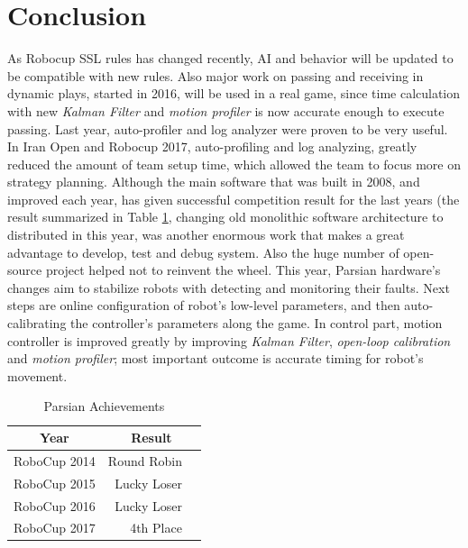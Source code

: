 \documentclass{llncs}
\begin{document}
%
\newpage

\section{Conclusion}
As Robocup SSL rules has changed recently, AI and behavior will be updated to be compatible with new rules. 
\newline
Also major work on passing and receiving in dynamic plays, started in 2016\cite{p:16}, will be used in a real game, since time calculation with new \textit{Kalman Filter} and \textit{motion profiler} is now accurate enough to execute passing.
\newline
Last year, auto-profiler and log analyzer were proven to be very useful. In Iran Open and Robocup 2017\cite{p:17}, auto-profiling and log analyzing, greatly reduced the amount of team setup time, which allowed the team to focus more on strategy planning. Although the main software that was built in 2008, and improved each year, has given successful competition result for the last years (the result summarized in Table \ref{tab:achive}, changing old monolithic software architecture to distributed in this year, was another enormous work that makes a great advantage to develop, test and debug system. Also the huge number of open-source project helped not to reinvent the wheel.
\newline
This year, Parsian hardware's changes aim to stabilize robots with detecting and monitoring their faults. Next steps are online configuration of robot's low-level parameters, and then auto-calibrating the controller's parameters along the game.
\newline
In control part, motion controller is improved greatly by improving \textit{Kalman Filter}, \textit{open-loop calibration} and \textit{motion profiler}; most important outcome is accurate timing for robot's movement.


\begin{table}
\caption{Parsian Achievements}\label{tab:achive}
\begin{center}
\begin{tabular}{r@{\quad}rl}
\hline
\multicolumn{1}{c}{\rule{0pt}{12pt}Year} & \multicolumn{2}{c}{Result}\\[2pt]
\hline\rule{0pt}{12pt}
RoboCup 2014  &     Round Robin& \\
RoboCup 2015  &     Lucky Loser& \\
RoboCup 2016  &     Lucky Loser& \\
RoboCup 2017  &     4th Place  & \\[2pt]
\hline
\end{tabular}
\end{center}
\end{table}
\end{document}
